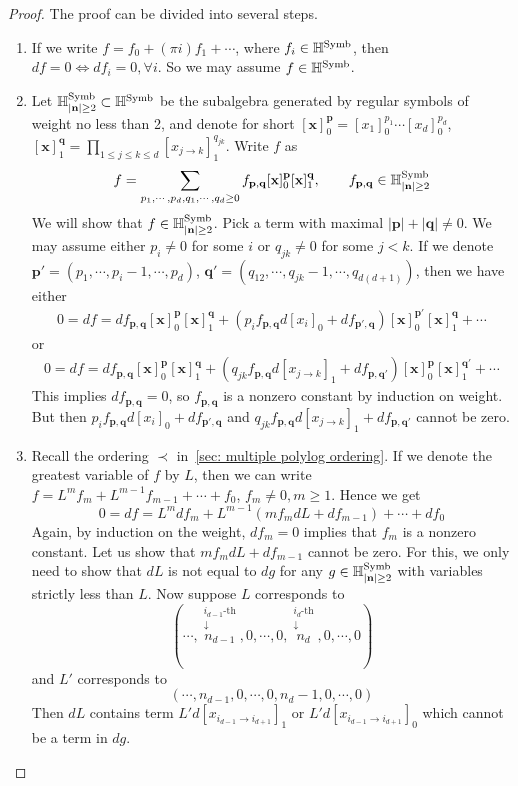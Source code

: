 \begin{proof}
The proof can be divided into several steps.
\begin{enumerate}
\item If we write $f=f_0+(\pi i)f_1+\cdots$, where $f_i\in\mathbb H^{\operatorname{Symb}}$, then $df=0\iff df_i=0,\forall i$. So we may assume $f\in\mathbb H^{\operatorname{Symb}}$.
\item Let $\mathbb H^{\operatorname{Symb}}_{|\mathbf n|\geq2}\subset \mathbb H^{\operatorname{Symb}}$ be the subalgebra generated by regular symbols of weight no less than 2, and denote for short $[\mathbf x]_0^{\mathbf p}=[x_1]_0^{p_1}\cdots[x_d]_0^{p_d}$, $[\mathbf x]_1^{\mathbf q}=\displaystyle\prod_{1\leq j\leq k\leq d}[x_{j\to k}]_1^{q_{jk}}$. Write $f$ as
\[
f=\sum_{p_1,\cdots,p_d,q_1,\cdots,q_d\geq0}f_{\mathbf p,\mathbf q}[\mathbf x]_0^{\mathbf p}[\mathbf x]_1^{\mathbf q},\qquad f_{\mathbf p,\mathbf q}\in \mathbb H^{\operatorname{Symb}}_{|\mathbf n|\geq2}
\]
We will show that $f\in\mathbb H^{\operatorname{Symb}}_{|\mathbf n|\geq2}$. Pick a term with maximal $|\mathbf p|+|\mathbf q|\neq0$. We may assume either $p_i\neq0$ for some $i$ or $q_{jk}\neq0$ for some $j<k$. If we denote $\mathbf p'=(p_1,\cdots,p_i-1,\cdots,p_d)$, $\mathbf q'=(q_{12},\cdots,q_{jk}-1,\cdots,q_{d(d+1)})$, then we have either
\begin{align*}
0=df=df_{\mathbf p,\mathbf q}[\mathbf x]_0^{\mathbf p}[\mathbf x]_1^{\mathbf q}+(p_if_{\mathbf p,\mathbf q}d[x_i]_0+df_{\mathbf p',\mathbf q})[\mathbf x]_0^{\mathbf p'}[\mathbf x]_1^{\mathbf q}+\cdots
\end{align*}
or
\begin{align*}
0=df=df_{\mathbf p,\mathbf q}[\mathbf x]_0^{\mathbf p}[\mathbf x]_1^{\mathbf q}+(q_{jk}f_{\mathbf p,\mathbf q}d[x_{j\to k}]_1+df_{\mathbf p,\mathbf q'})[\mathbf x]_0^{\mathbf p}[\mathbf x]_1^{\mathbf q'}+\cdots
\end{align*}
This implies $df_{\mathbf p,\mathbf q}=0$, so $f_{\mathbf p,\mathbf q}$ is a nonzero constant by induction on weight. But then $p_if_{\mathbf p,\mathbf q}d[x_i]_0+df_{\mathbf p',\mathbf q}$ and $q_{jk}f_{\mathbf p,\mathbf q}d[x_{j\to k}]_1+df_{\mathbf p,\mathbf q'}$ cannot be zero.
\item Recall the ordering $\prec$ in~\ref{sec: multiple polylog ordering}. If we denote the greatest variable of $f$ by $L$, then we can write $f=L^mf_m+L^{m-1}f_{m-1}+\cdots+f_0$, $f_m\neq0,m\geq1$. Hence we get
\[
0=df=L^{m}df_{m}+L^{m-1}(mf_{m}dL+df_{m-1})+\cdots+df_0
\]
Again, by induction on the weight, $df_m=0$ implies that $f_m$ is a nonzero constant. Let us show that $mf_mdL+df_{m-1}$ cannot be zero. For this, we only need to show that $dL$ is not equal to $dg$ for any $g\in\mathbb H^{\operatorname{Symb}}_{|\mathbf n|\geq2}$ with variables strictly less than $L$. Now suppose $L$ corresponds to
\[
(\cdots,\overset{\substack{i_{d-1}\text{-th}\\\downarrow}}{n_{d-1}},0,\cdots,0,\overset{\substack{i_d\text{-th}\\\downarrow}}{n_d},0,\cdots,0)
\]
and $L'$ corresponds to
\[
(\cdots,n_{d-1},0,\cdots,0,n_d-1,0,\cdots,0)
\]
Then $dL$ contains term $L'd[x_{i_{d-1}\to i_{d+1}}]_1$ or $L'd[x_{i_{d-1}\to i_{d+1}}]_0$ which cannot be a term in $dg$.
\end{enumerate}
\end{proof}

